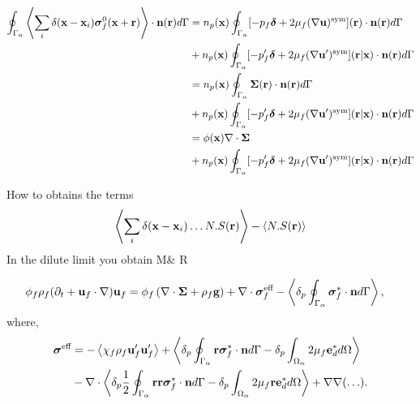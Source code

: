 \begin{align}
    \oint_{\Gamma_{\alpha}}  \left<\sum_i \delta(\textbf{x}-\textbf{x}_i) \bm\sigma_f^0(\textbf{x}+ \textbf{r}) \right>\cdot \textbf{n}(\textbf{r}) d\Gamma
    &= 
    n_p(\textbf{x})\oint_{\Gamma_{\alpha}}  [-p_f \bm\delta +2 \mu_f (\mathbf{\nabla} \textbf{u})^\text{sym}](\textbf{r})\cdot \textbf{n}(\textbf{r}) d\Gamma\\
    &+ n_p(\textbf{x})\oint_{\Gamma_{\alpha}}  [-p_f' \bm\delta +2 \mu_f (\mathbf{\nabla} \textbf{u}')^\text{sym}](\textbf{r}|\textbf{x})\cdot \textbf{n}(\textbf{r}) d\Gamma\\
    &= 
    n_p(\textbf{x})\oint_{\Gamma_{\alpha}}  \bm\Sigma (\textbf{r})\cdot \textbf{n}(\textbf{r}) d\Gamma\\
    &+ n_p(\textbf{x})\oint_{\Gamma_{\alpha}}  [-p_f' \bm\delta +2 \mu_f (\mathbf{\nabla} \textbf{u}')^\text{sym}](\textbf{r}|\textbf{x})\cdot \textbf{n}(\textbf{r}) d\Gamma\\
    &= 
    \phi (\textbf{x})\mathbf{\nabla}\cdot \bm\Sigma\\
    &+ n_p(\textbf{x})\oint_{\Gamma_{\alpha}}  [-p_f' \bm\delta +2 \mu_f (\mathbf{\nabla} \textbf{u}')^\text{sym}](\textbf{r}|\textbf{x})\cdot \textbf{n}(\textbf{r}) d\Gamma
\end{align}

How to obtains the terms 
\begin{equation}
    \left<
        \sum_i \delta(\textbf{x}-\textbf{x}_i)
        \ldots N.S(\textbf{r})
    \right>
    -\left<
         N.S(\textbf{r})
    \right>
\end{equation}
In the dilute limit you obtain M\& R

\begin{align}
    \phi_f \rho_f(\pddt + \textbf{u}_f  \cdot \grad) \textbf{u}_f
    &= \phi_f 
    \left(\div \bm{\Sigma}
    + \rho_f \textbf{g}\right)
    + \div \bm\sigma_f^{\text{eff}}
    - \pSavg{\bm\sigma_f^{*}\cdot \textbf{n}}, 
    \label{eq:dt_uf2}
\end{align}
where,
\begin{align}
    \bm{\sigma}^{\text{eff}} 
    &= 
    - \avg{\chi_f\rho_f \textbf{u}_f'\textbf{u}_f'} 
    + \pavg{\intS{\textbf{r}\bm\sigma^{*}_f\cdot \textbf{n}} - \delta_p\intO{2\mu_f\textbf{e}_d^*}}\nonumber\\
    &- \div
        \pavg{ \frac{1}{2}\intS{\textbf{rr}\bm\sigma^{*}_f\cdot \textbf{n}}
        - \delta_p\intO{2\mu_f \textbf{r} \textbf{e}_d^*}}
        + \grad\grad (\ldots). 
    \label{eq:def_sigma_eff_f2}
\end{align}

